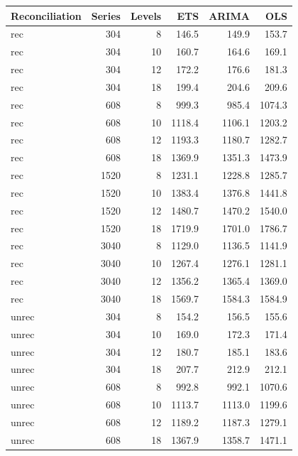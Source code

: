 \documentclass[11pt,a4paper,]{article}
\let\origtable\table
\let\endorigtable\endtable
\renewenvironment{table}[1][2] {
    \expandafter\origtable\expandafter[!htbp]
} {
    \endorigtable
}
\begin{document}
\begin{table}[!h]

\caption{\label{tab:TourismdatasimrollinglevelNS}Mean RMSE on 8, 10, 12 and 18 levels of hierarchy with 304, 608, 1520 and 3040 number of bottom level series for ETS, ARIMA and OLS with and without reconciliation - two years forecast points with 0.5 error value - rolling origin - Simulated tourism dataset}
\centering
\begin{tabular}[t]{lrrrrr}
\toprule
Reconciliation & Series & Levels & ETS & ARIMA & OLS\\
\midrule
rec & 304 & 8 & 146.5 & 149.9 & 153.7\\
rec & 304 & 10 & 160.7 & 164.6 & 169.1\\
rec & 304 & 12 & 172.2 & 176.6 & 181.3\\
rec & 304 & 18 & 199.4 & 204.6 & 209.6\\
rec & 608 & 8 & 999.3 & 985.4 & 1074.3\\
rec & 608 & 10 & 1118.4 & 1106.1 & 1203.2\\
rec & 608 & 12 & 1193.3 & 1180.7 & 1282.7\\
rec & 608 & 18 & 1369.9 & 1351.3 & 1473.9\\
rec & 1520 & 8 & 1231.1 & 1228.8 & 1285.7\\
rec & 1520 & 10 & 1383.4 & 1376.8 & 1441.8\\
rec & 1520 & 12 & 1480.7 & 1470.2 & 1540.0\\
rec & 1520 & 18 & 1719.9 & 1701.0 & 1786.7\\
rec & 3040 & 8 & 1129.0 & 1136.5 & 1141.9\\
rec & 3040 & 10 & 1267.4 & 1276.1 & 1281.1\\
rec & 3040 & 12 & 1356.2 & 1365.4 & 1369.0\\
rec & 3040 & 18 & 1569.7 & 1584.3 & 1584.9\\
unrec & 304 & 8 & 154.2 & 156.5 & 155.6\\
unrec & 304 & 10 & 169.0 & 172.3 & 171.4\\
unrec & 304 & 12 & 180.7 & 185.1 & 183.6\\
unrec & 304 & 18 & 207.7 & 212.9 & 212.1\\
unrec & 608 & 8 & 992.8 & 992.1 & 1070.6\\
unrec & 608 & 10 & 1113.7 & 1113.0 & 1199.6\\
unrec & 608 & 12 & 1189.2 & 1187.3 & 1279.1\\
unrec & 608 & 18 & 1367.9 & 1358.7 & 1471.1\\

\end{tabular}
\end{table}
\end{document}
